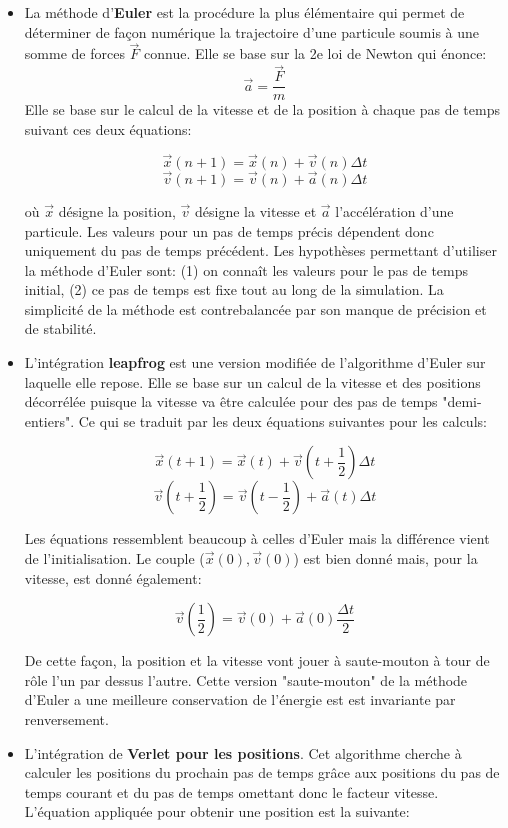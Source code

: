 \begin{itemize}
	\item La méthode d'\textbf{Euler} est la procédure la plus élémentaire qui permet de déterminer de façon numérique la trajectoire d'une particule soumis à une somme de forces $\overrightarrow{F}$ connue. Elle se base sur la 2e loi de Newton qui énonce:
	$$\overrightarrow{a} = \frac{\overrightarrow{F}}{m}$$
	Elle se base sur le calcul de la vitesse et de la position à chaque pas de temps suivant ces deux équations:

	$$\overrightarrow{x}(n+1) = \overrightarrow{x}(n) + \overrightarrow{v}(n)\Delta t$$
	$$\overrightarrow{v}(n+1) = \overrightarrow{v}(n) + \overrightarrow{a}(n)\Delta t$$

	où $\overrightarrow{x}$ désigne la position, $\overrightarrow{v}$ désigne la vitesse et $\overrightarrow{a}$ l'accélération d'une particule.
	Les valeurs pour un pas de temps précis dépendent donc uniquement du pas de temps précédent. Les hypothèses permettant d'utiliser la méthode d'Euler sont: (1) on connaît les valeurs pour le pas de temps initial, (2) ce pas de temps est fixe tout au long de la simulation. La simplicité de la méthode est contrebalancée par son manque de précision et de stabilité.
	\item L'intégration \textbf{leapfrog} est une version modifiée de l'algorithme d'Euler sur laquelle elle repose. Elle se base sur un calcul de la vitesse et des positions décorrélée puisque la vitesse va être calculée pour des pas de temps "demi-entiers". Ce qui se traduit par les deux équations suivantes pour les calculs:

	$$\overrightarrow{x}(t+1) = \overrightarrow{x}(t) + \overrightarrow{v}(t+\frac{1}{2})\Delta t$$
	$$\overrightarrow{v}(t+\frac{1}{2}) = \overrightarrow{v}(t-\frac{1}{2}) + \overrightarrow{a}(t)\Delta t$$

	Les équations ressemblent beaucoup à celles d'Euler mais la différence vient de l'initialisation. Le couple ($\overrightarrow{x}(0),\overrightarrow{v}(0)$) est bien donné mais, pour la vitesse, est donné également:

	$$\overrightarrow{v}(\frac{1}{2}) = \overrightarrow{v}(0) + \overrightarrow{a}(0)\frac{\Delta t}{2}$$

	De cette façon, la position et la vitesse vont jouer à saute-mouton à tour de rôle l'un par dessus l'autre. Cette version "saute-mouton" de la méthode d'Euler a une meilleure conservation de l'énergie est est invariante par renversement.
	\item L'intégration de \textbf{Verlet pour les positions}. Cet algorithme cherche à calculer les positions du prochain pas de temps grâce aux positions du pas de temps courant et du pas de temps omettant donc le facteur vitesse. L'équation appliquée pour obtenir une position est la suivante: 


\end{itemize}
